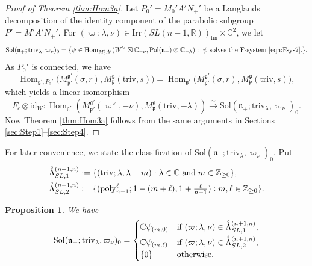 \documentclass[reqno,11pt]{amsart}
\newtheorem{prop}[equation]{Proposition}
\theoremstyle{remark}
\theoremstyle{definition}
\numberwithin{equation}{section}
\newcommand{\gL}{\Lambda}
\newcommand{\fg}{{\mathfrak g}}
\newcommand{\fn}{{\mathfrak n}}
\newcommand{\fp}{{\mathfrak p}}
\newcommand{\R}{\mathbb{R}}
\newcommand{\C}{\mathbb{C}}
\newcommand{\Z}{\mathbb{Z}}
\newcommand{\Hom}{\operatorname{Hom}}
\newcommand{\Sol}{\mathrm{Sol}}
\newcommand{\Pol}{\mathrm{Pol}}
\newcommand{\poly}{\mathrm{poly}}
\newcommand{\To}{\longrightarrow}
\newcommand{\Irr}{\mathrm{Irr}}
\newcommand{\triv}{\mathrm{triv}}
\newcommand{\fin}{\mathrm{fin}}
\newcommand{\id}{\mathrm{id}}
\newcommand{\Mp}{M^{\fg}_{\fp}}
\newcommand{\Mpp}{M^{\fg'}_{\fp'}}
\begin{document}
\begin{proof}[Proof of Theorem \ref{thm:Hom3a}]

Let $P_0' = M_0'A'N_+'$ be a Langlands decomposition of 
 the identity component of the parabolic subgroup $P'=M'A'N_+'$. 
For $(\varpi; \lambda, \nu) \in \Irr(SL(n-1,\R))_\fin\times \C^2$, 
we let
\begin{equation*}
\Sol(\fn_+; \triv_{\lambda}, \varpi_{\nu})_0
=
\{ \psi \in 
\Hom_{M_0'A'}(W^\vee\boxtimes \C_{-\nu}, 
\Pol(\fn_+)\otimes \C_{-\lambda}): 
\text{
$\psi$ solves the F-system \eqref{eqn:Fsys2}.}\}.
\end{equation*}
As $P_0'$ is connected, we have 
 \begin{equation*}
\Hom_{\fg', P_0'}\big(\Mpp(\sigma,r), \Mp(\triv, s)\big)
=
\Hom_{\fg'}\big(\Mpp(\sigma,r), \Mp(\triv, s)\big),
\end{equation*}
which yields  a linear isomorphism
\begin{equation}\label{eqn:HD0}
F_c \otimes \id_W \colon
\Hom_{\fg'}(\Mpp(\varpi^\vee, -\nu), \Mp(\triv,-\lambda))
\stackrel{\sim}{\To}
\Sol(\fn_+; \triv_{\lambda}, \varpi_{\nu})_0.
\end{equation}
Now Theorem \ref{thm:Hom3a} follows from the same arguments
in Sections \ref{sec:Step1}--\ref{sec:Step4}.
\end{proof}

For later convenience, we state
the classification of $\Sol(\fn_+; \triv_{\lambda}, \varpi_{\nu})_0$.
Put
\begin{align*}
\accentset{\circ}{\gL}^{(n+1,n)}_{SL,1}&:=\{
(\triv;\lambda, \lambda+m)
:  \lambda \in \C \; \text{and} \; m\in \Z_{\geq 0}\},\\
\accentset{\circ}{\gL}^{(n+1,n)}_{SL,2}&:=\{
(\poly^\ell_{n-1};1-(m+\ell), 1+\tfrac{\ell}{n-1}) :  m,  \ell\in \Z_{\geq 0}\}.
\end{align*}

\begin{prop}\label{prop:Sol30a}
We have 
\begin{equation*}
\Sol(\fn_+; \triv_{\lambda}, \varpi_{\nu})_0
=
\begin{cases}
\C\psi_{(m,0)} 
& \text{if $(\varpi; \lambda, \nu)\in 
\accentset{\circ}{\gL}^{(n+1,n)}_{SL,1}$,}\\[3pt]
\C \psi_{(m,\ell)} 
& \text{if $(\varpi; \lambda, \nu)\in
\accentset{\circ}{\gL}^{(n+1,n)}_{SL,2}$,}\\
\{0\} & \text{otherwise.}
\end{cases}
\end{equation*}
\end{prop}
\end{document}
